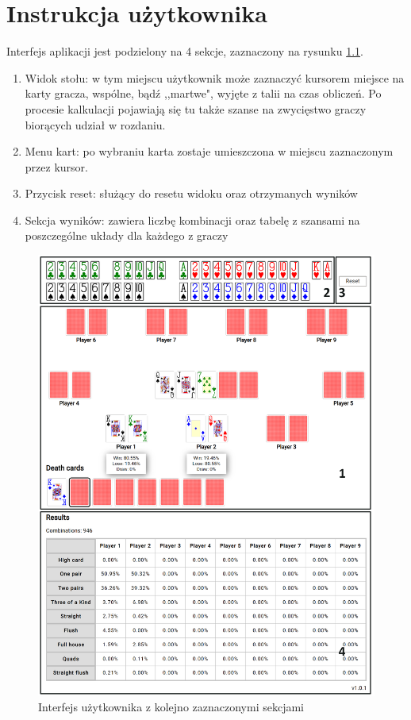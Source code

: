 \chapter{Instrukcja użytkownika}
\label{chapter:5}

Interfejs aplikacji jest podzielony na 4 sekcje, zaznaczony na rysunku \ref{fig:interface}.

\begin{enumerate}
    \item Widok stołu: w tym miejscu użytkownik może zaznaczyć kursorem miejsce na karty gracza, wspólne, bądź ,,martwe", wyjęte z talii na czas obliczeń. Po procesie kalkulacji pojawiają się tu także szanse na zwycięstwo graczy biorących udział w rozdaniu.
    \item Menu kart: po wybraniu karta zostaje umieszczona w miejscu zaznaczonym przez kursor.
    \item Przycisk reset: służący do resetu widoku oraz otrzymanych wyników
    \item Sekcja wyników: zawiera liczbę kombinacji oraz tabelę z szansami na poszczególne układy dla każdego z graczy
\end{enumerate}

\begin{figure}[ht]
    \includegraphics[width=\textwidth]{images/interface.png}
    \caption{Interfejs użytkownika z kolejno zaznaczonymi sekcjami}
    \label{fig:interface}
\end{figure}

